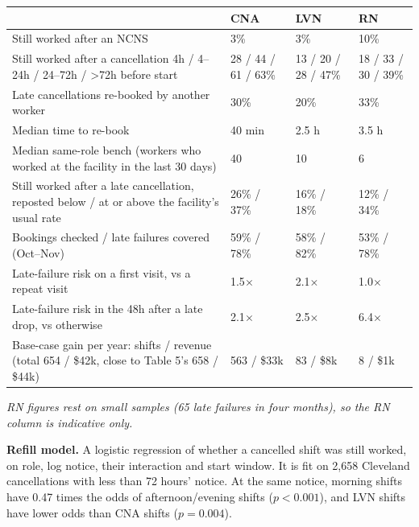 \begin{center}\small
{}
\begin{tabularx}{\textwidth}{@{}LR{3.0cm}R{3.0cm}R{3.0cm}@{}}
\toprule
 & CNA & LVN & RN \\
\midrule
Still worked after an NCNS & 3\% & 3\% & 10\% \\
Still worked after a cancellation \lthan{}4h / 4--24h / 24--72h / \textgreater72h before start & 28 / 44 / 61 / 63\% &
13 / 20 / 28 / 47\% & 18 / 33 / 30 / 39\% \\
Late cancellations re-booked by another worker & 30\% & 20\% & 33\% \\
Median time to re-book & 40 min & 2.5 h & 3.5 h \\
Median same-role bench (workers who worked at the facility in the last 30 days) & 40 & 10 & 6 \\
Still worked after a late cancellation, reposted below / at or above the facility's usual rate & 26\% / 37\% & 16\% /
18\% & 12\% / 34\% \\
Bookings checked / late failures covered (Oct--Nov) & 59\% / 78\% & 58\% / 82\% & 53\% / 78\% \\
Late-failure risk on a first visit, vs a repeat visit & 1.5$\times$ & 2.1$\times$ & 1.0$\times$ \\
Late-failure risk in the 48h after a late drop, vs otherwise & 2.1$\times$ & 2.5$\times$ & 6.4$\times$ \\
Base-case gain per year: shifts / revenue (total 654 / \$42k, close to Table 5's 658 / \$44k) & 563 / \$33k & 83 / \$8k &
8 / \$1k \\
\bottomrule
\end{tabularx}
\end{center}
{\small\textit{RN figures rest on small samples (65 late failures in four months), so the RN column is indicative only.}}

\textbf{Refill model.} A logistic regression of whether a cancelled shift was still worked, on role, log notice, their
interaction and start window. It is fit on 2,658 Cleveland cancellations with less than 72 hours' notice. At the same
notice, morning shifts have 0.47 times the odds of afternoon/evening shifts ($p<0.001$), and LVN shifts have lower odds
than CNA shifts ($p=0.004$).


